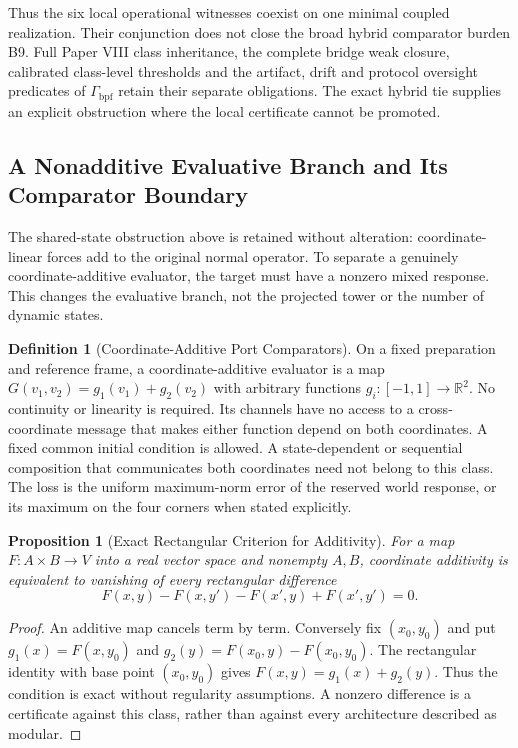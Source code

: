 \documentclass[11pt,a4paper]{article}
\newtheorem{proposition}[theorem]{Proposition}
\theoremstyle{definition}
\newtheorem{definition}[theorem]{Definition}
\newcommand{\GateBridge}{\Gamma_{\mathrm{bpf}}}
\begin{document}
Thus the six local operational witnesses coexist on one minimal coupled realization. Their conjunction does not close the broad hybrid comparator burden B9. Full Paper VIII class inheritance, the complete bridge weak closure, calibrated class-level thresholds and the artifact, drift and protocol oversight predicates of $\GateBridge$ retain their separate obligations. The exact hybrid tie supplies an explicit obstruction where the local certificate cannot be promoted.


\subsection{A Nonadditive Evaluative Branch and Its Comparator Boundary}

The shared-state obstruction above is retained without alteration: coordinate-linear forces add to the original normal operator. To separate a genuinely coordinate-additive evaluator, the target must have a nonzero mixed response. This changes the evaluative branch, not the projected tower or the number of dynamic states.

\begin{definition}[Coordinate-Additive Port Comparators]\label{def:bridge-additive-port-class}
On a fixed preparation and reference frame, a coordinate-additive evaluator is a map $G(v_1,v_2)=g_1(v_1)+g_2(v_2)$ with arbitrary functions $g_i:[-1,1]\to\mathbb R^2$. No continuity or linearity is required. Its channels have no access to a cross-coordinate message that makes either function depend on both coordinates. A fixed common initial condition is allowed. A state-dependent or sequential composition that communicates both coordinates need not belong to this class. The loss is the uniform maximum-norm error of the reserved world response, or its maximum on the four corners when stated explicitly.
\end{definition}

\begin{proposition}[Exact Rectangular Criterion for Additivity]\label{prop:bridge-rectangular-additivity}
For a map $F:A\times B\to V$ into a real vector space and nonempty $A,B$, coordinate additivity is equivalent to vanishing of every rectangular difference
\[
 F(x,y)-F(x,y')-F(x',y)+F(x',y')=0.
\]
\end{proposition}
\begin{proof}
An additive map cancels term by term. Conversely fix $(x_0,y_0)$ and put $g_1(x)=F(x,y_0)$ and $g_2(y)=F(x_0,y)-F(x_0,y_0)$. The rectangular identity with base point $(x_0,y_0)$ gives $F(x,y)=g_1(x)+g_2(y)$. Thus the condition is exact without regularity assumptions. A nonzero difference is a certificate against this class, rather than against every architecture described as modular.
\end{proof}
\end{document}

